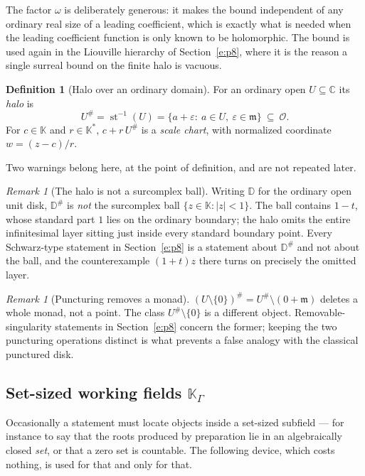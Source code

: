\documentclass[11pt,a4paper]{article}
\numberwithin{equation}{section}
\theoremstyle{definition}
\newtheorem{definition}[theorem]{Definition}
\theoremstyle{remark}
\newtheorem{remark}[theorem]{Remark}
\theoremstyle{plain}
\newcommand{\K}{\mathbb K}
\newcommand{\CC}{\mathbb C}
\newcommand{\Ov}{\mathcal O}
\newcommand{\mm}{\mathfrak m}
\DeclareMathOperator{\st}{st}
\newcommand{\tm}{t}
\newcommand{\halo}[1]{#1^{\#}}
\newcommand{\abs}[1]{\lvert #1\rvert}
\begin{document}
The factor $\omega$ is deliberately generous: it makes the bound
independent of any ordinary real size of a leading coefficient, which is
exactly what is needed when the leading coefficient function is only
known to be holomorphic.  The bound is used again in the Liouville
hierarchy of Section~\ref{e:p8}, where it is the reason a single surreal bound on
the finite halo is vacuous.

\begin{definition}[Halo over an ordinary domain]\label{a:def:halo}
For an ordinary open $U\subseteq\CC$ its \emph{halo} is
\[
 \halo U=\st^{-1}(U)=\{a+\varepsilon:\ a\in U,\ \varepsilon\in\mm\}
 \ \subseteq\ \Ov .
\]
For $c\in\K$ and $r\in\K^{*}$, $c+r\,\halo U$ is a \emph{scale chart},
with normalized coordinate $w=(z-c)/r$.
\end{definition}

Two warnings belong here, at the point of definition, and are not
repeated later.

\begin{remark}[The halo is not a surcomplex ball]\label{a:rem:halonotball}
Writing $\mathbb D$ for the ordinary open unit disk, $\halo{\mathbb D}$
is \emph{not} the surcomplex ball $\{z\in\K:\abs z<1\}$.  The ball
contains $1-\tm$, whose standard part $1$ lies on the ordinary boundary;
the halo omits the entire infinitesimal layer sitting just inside every
standard boundary point.  Every Schwarz-type statement in Section~\ref{e:p8} is a
statement about $\halo{\mathbb D}$ and not about the ball, and the
counterexample $(1+\tm)z$ there turns on precisely the omitted layer.
\end{remark}

\begin{remark}[Puncturing removes a monad]\label{a:rem:puncture}
$\halo{(U\setminus\{0\})}=\halo U\setminus(0+\mm)$ deletes a whole
monad, not a point.  The class $\halo U\setminus\{0\}$ is a different
object.  Removable-singularity statements in Section~\ref{e:p8} concern the former;
keeping the two puncturing operations distinct is what prevents a false
analogy with the classical punctured disk.
\end{remark}

\subsection{Set-sized working fields \texorpdfstring{$\K_\Gamma$}{K Gamma}}\label{a:sec:KGamma}

Occasionally a statement must locate objects inside a set-sized
subfield --- for instance to say that the roots produced by preparation
lie in an algebraically closed \emph{set}, or that a zero set is
countable.  The following device, which costs nothing, is used for that
and only for that.
\end{document}
